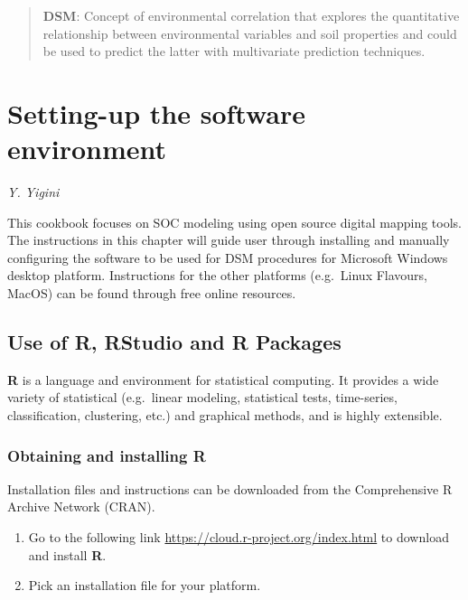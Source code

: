 \documentclass[10pt,b5paper,]{book}
\providecommand{\tightlist}{%
  \setlength{\itemsep}{0pt}\setlength{\parskip}{0pt}}
\theoremstyle{definition}
\theoremstyle{definition}
\theoremstyle{definition}
\theoremstyle{remark}
\begin{document}
\begin{quote}
\textbf{DSM}: Concept of environmental correlation that explores the
quantitative relationship between environmental variables and soil
properties and could be used to predict the latter with multivariate
prediction techniques.
\end{quote}

\hypertarget{setting-up-the-software-environment}{%
\chapter{Setting-up the software
environment}\label{setting-up-the-software-environment}}

\emph{Y. Yigini}

This cookbook focuses on SOC modeling using open source digital mapping
tools. The instructions in this chapter will guide user through
installing and manually configuring the software to be used for DSM
procedures for Microsoft Windows desktop platform. Instructions for the
other platforms (e.g.~Linux Flavours, MacOS) can be found through free
online resources.

\hypertarget{use-of-r-rstudio-and-r-packages}{%
\section{Use of R, RStudio and R
Packages}\label{use-of-r-rstudio-and-r-packages}}

\textbf{R} is a language and environment for statistical computing. It
provides a wide variety of statistical (e.g.~linear modeling,
statistical tests, time-series, classification, clustering, etc.) and
graphical methods, and is highly extensible.

\hypertarget{obtaining-and-installing-r}{%
\subsection{Obtaining and installing
R}\label{obtaining-and-installing-r}}

Installation files and instructions can be downloaded from the
Comprehensive R Archive Network (CRAN).

\begin{enumerate}
\def\labelenumi{\arabic{enumi}.}
\tightlist
\item
  Go to the following link \url{https://cloud.r-project.org/index.html}
  to download and install \textbf{R}.
\item
  Pick an installation file for your platform.
\end{enumerate}
\end{document}
